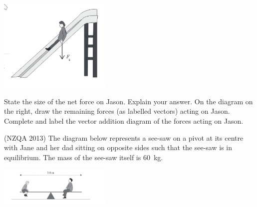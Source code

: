 \documentclass[a4paper]{exam}
\begin{document}
\begin{questions}
\begin{parts}
              \includegraphics[width=0.4\textwidth]{nzqa20131}
          \begin{subparts}
            \subpart State the size of the net force on Jason. Explain your answer.
            \subpart On the diagram on the right, draw the remaining
                     forces (as labelled vectors) acting on Jason.
            \subpart Complete and label the vector addition
                     diagram of the forces acting on Jason.
          \end{subparts}
      \end{parts}
    \question (NZQA 2013) The diagram below represents a see-saw on a pivot at its centre with Jane and her dad sitting on
              opposite sides such that the see-saw is in equilibrium. The mass of the see-saw itself is \SI{60}{\kilo\gram}.

              \includegraphics[width=0.4\textwidth]{nzqa201321}
\end{questions}
\end{document}

